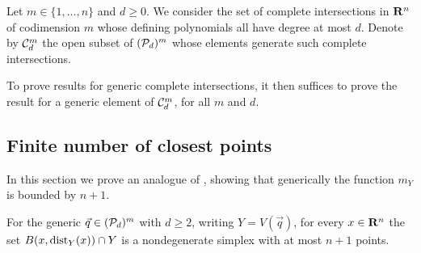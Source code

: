 \begin{definition}
\label{E!D:complete-intersection}
  Let $m \in \{1, \ldots, n\}$ and $d \geq 0$. We consider the set of complete intersections in $\mathbf{R}^n$ of codimension $m$ whose defining polynomials all have degree at most $d$. Denote by $\mathcal{C}_d^m$ the open subset of $(\mathcal{P}_d)^m$ whose elements generate such complete intersections.
  
  To prove results for generic complete intersections, it then suffices to prove the result for a generic element of $\mathcal{C}_d^m$, for all $m$ and $d$.
\end{definition}

\subsection{Finite number of closest points}

In this section we prove an analogue of \cite[Proposition 3]{Yomdin1981}, showing that generically the function $m_Y$ is bounded by $n+1$. 

\begin{theorem}
\label{E!T:Yomdin}
  For the generic $\vec{q} \in (\mathcal{P}_d)^m$ with $d \geq 2$, writing $Y = V(\vec{q})$, for every $x \in \mathbf{R}^n$ the set $B(x, \operatorname{dist}_Y(x)) \cap Y$ is a nondegenerate simplex with at most $n + 1$ points.
\end{theorem}

